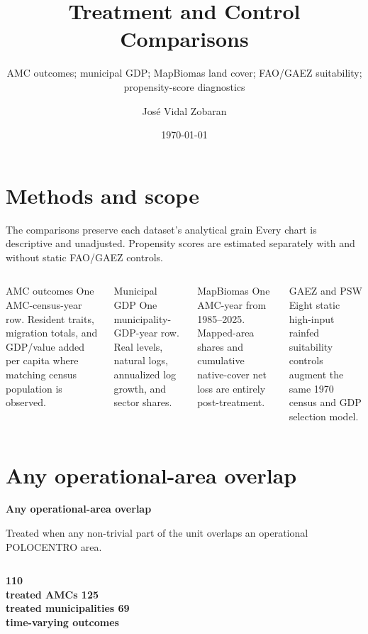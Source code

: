\documentclass[aspectratio=169]{beamer}
\title[POLOCENTRO comparisons]{Treatment and Control Comparisons}
\subtitle{AMC outcomes; municipal GDP; MapBiomas land cover; FAO/GAEZ suitability; propensity-score diagnostics}
\author{José Vidal Zobaran}
\institute{FGV-EPGE}
\date{\today}
\begin{document}
\begin{frame}
  \titlepage
\end{frame}
\section{Methods and scope}
\begin{frame}{The comparisons preserve each dataset's analytical grain}
\small
Every chart is descriptive and unadjusted. Propensity scores are estimated separately with and without static FAO/GAEZ controls.
\begin{columns}[T,totalwidth=\textwidth]
\begin{block}{AMC outcomes}
One AMC-census-year row. Resident traits, migration totals, and GDP/value added per capita where matching census population is observed.
\end{block}
\begin{block}{Municipal GDP}
One municipality-GDP-year row. Real levels, natural logs, annualized log growth, and sector shares.
\end{block}
\begin{block}{MapBiomas}
One AMC-year from 1985--2025. Mapped-area shares and cumulative native-cover net loss are entirely post-treatment.
\end{block}
\begin{block}{GAEZ and PSW}
Eight static high-input rainfed suitability controls augment the same 1970 census and GDP selection model.
\end{block}
\end{columns}
\end{frame}
\section{Any operational-area overlap}
\begin{frame}[plain]
\vfill
{\Huge\bfseries Any operational-area overlap\par}
\vspace{1em}
{\large Treated when any non-trivial part of the unit overlaps an operational POLOCENTRO area.\par}
\vspace{2em}
\begin{columns}[T,totalwidth=\textwidth]
\centering\Huge\bfseries 110\\\normalsize treated AMCs
\centering\Huge\bfseries 125\\\normalsize treated municipalities
\centering\Huge\bfseries 69\\\normalsize time-varying outcomes
\end{columns}
\vfill
\end{frame}
\end{document}
